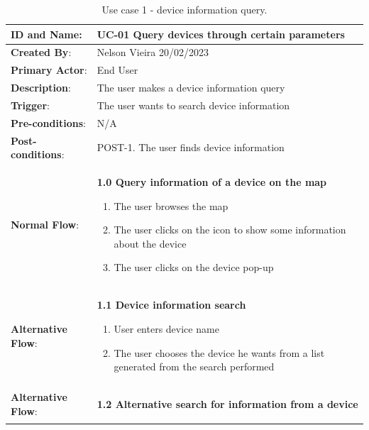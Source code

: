 \begin{table}[H]
    \centering
    \caption{Use case 1 - device information query.}
    \label{table:use_case1}
    \vspace{1em}
    \begin{adjustbox}{width=1.2\textwidth,center=\textwidth}
        \begin{tabular}{|m{4cm}|m{12cm}|}
            \hline
            \textbf{ID and Name}: & UC-01 Query devices through certain parameters \\
            \hline
            \textbf{Created By}: & Nelson Vieira 20/02/2023 \\
            \hline
            \textbf{Primary Actor}: & End User \\
            \hline
            \textbf{Description}: & The user makes a device information query \\
            \hline
            \textbf{Trigger}: & The user wants to search device information \\
            \hline
            \textbf{Pre-conditions}: & N/A \\
            \hline
            \textbf{Post-conditions}: & POST-1. The user finds device information \\
            \hline
            \textbf{Normal Flow}: & \textbf{1.0 Query information of a device on the map}
            \begin{enumerate}
                \item The user browses the map
                \item The user clicks on the icon to show some information about the device
                \item The user clicks on the device pop-up
            \end{enumerate} \\
            \hline
            \textbf{Alternative Flow}: & \textbf{1.1 Device information search}
            \begin{enumerate}
                \item User enters device name
                \item The user chooses the device he wants from a list generated from the search performed
            \end{enumerate} \\
            \hline
            \textbf{Alternative Flow}: & \textbf{1.2 Alternative search for information from a device}
            \begin{enumerate}

\end{enumerate}
\end{tabular}
\end{adjustbox}
\end{table}
